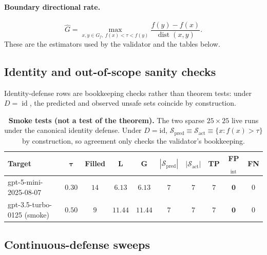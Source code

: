 \documentclass[11pt]{article}
\newcommand{\id}{\operatorname{id}}
\newcommand{\dist}{\operatorname{dist}}
\begin{document}
\paragraph{Boundary directional rate.}
\[
\hat G = \max_{x,y \in G_f,\ f(x)<\tau<f(y)}
\frac{f(y)-f(x)}{\dist(x,y)}.
\]
These are the estimators used by the validator and the tables below.

\subsection{Identity and out-of-scope sanity checks}
\label{sec:identity-sanity}

Identity-defense rows are bookkeeping checks rather than theorem tests:
under $D=\id$, the predicted and observed unsafe sets coincide by
construction.

\begin{table}[h]
\centering
\small
\caption{\textbf{Smoke tests (not a test of the theorem).} The two
sparse $25\times 25$ live runs under the canonical identity defense.
Under $D = \mathrm{id}$,
$\mathcal{S}_{\text{pred}} \equiv \mathcal{S}_{\text{act}} \equiv
\{x : f(x) > \tau\}$ by construction, so agreement only checks the
validator's bookkeeping.}
\label{tab:smoketests}
\begin{tabular}{lccccccccc}
\toprule
\textbf{Target} & $\boldsymbol{\tau}$ & \textbf{Filled} & $\boldsymbol{L}$ & $\boldsymbol{G}$ & $|\mathcal{S}_{\text{pred}}|$ & $|\mathcal{S}_{\text{act}}|$ & \textbf{TP} & \textbf{FP}$_{\text{int}}$ & \textbf{FN} \\
\midrule
gpt-5-mini-2025-08-07      & $0.30$ & $14$ & $6.13$  & $6.13$  & $7$ & $7$ & $7$ & $\mathbf{0}$ & $0$ \\
gpt-3.5-turbo-0125 (smoke) & $0.50$ & $9$  & $11.44$ & $11.44$ & $7$ & $7$ & $7$ & $\mathbf{0}$ & $0$ \\
\bottomrule
\end{tabular}
\end{table}

\subsection{Continuous-defense sweeps}
\label{app:continuous-sweeps}

\begin{table}[h]
\centering
\small
\caption{Continuous-defense sweep on the saturated
\texttt{gpt-3.5-turbo-0125} grid over continuous defense families.
$\hat\ell_{\mathrm{diag}}$ is a secondary diagonal estimator used for
relative comparison across sweep rows; the main-text estimator
$\hat\ell$ () gives the canonical per-cell
value $\hat\ell = 0.86$ for \textsc{ObliqueGP}.}
\label{tab:continuous-sweep}

\end{table}
\end{document}
